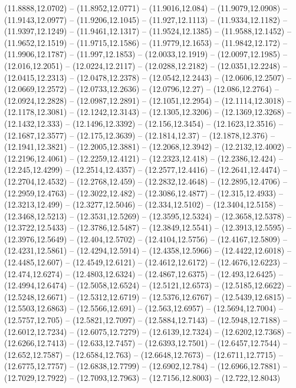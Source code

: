 {(11.8888,12.0702) -- (11.8952,12.0771) -- (11.9016,12.084) -- (11.9079,12.0908) -- (11.9143,12.0977) -- (11.9206,12.1045) -- (11.927,12.1113) -- (11.9334,12.1182) -- (11.9397,12.1249) -- (11.9461,12.1317) -- (11.9524,12.1385) -- (11.9588,12.1452) --
(11.9652,12.1519) -- (11.9715,12.1586) -- (11.9779,12.1653) -- (11.9842,12.172) -- (11.9906,12.1787) -- (11.997,12.1853) -- (12.0033,12.1919) -- (12.0097,12.1985) -- (12.016,12.2051) -- (12.0224,12.2117) -- (12.0288,12.2182) -- (12.0351,12.2248) --
(12.0415,12.2313) -- (12.0478,12.2378) -- (12.0542,12.2443) -- (12.0606,12.2507) -- (12.0669,12.2572) -- (12.0733,12.2636) -- (12.0796,12.27) -- (12.086,12.2764) -- (12.0924,12.2828) -- (12.0987,12.2891) -- (12.1051,12.2954) -- (12.1114,12.3018) --
(12.1178,12.3081) -- (12.1242,12.3143) -- (12.1305,12.3206) -- (12.1369,12.3268) -- (12.1432,12.333) -- (12.1496,12.3392) -- (12.156,12.3454) -- (12.1623,12.3516) -- (12.1687,12.3577) -- (12.175,12.3639) -- (12.1814,12.37) -- (12.1878,12.376) --
(12.1941,12.3821) -- (12.2005,12.3881) -- (12.2068,12.3942) -- (12.2132,12.4002) -- (12.2196,12.4061) -- (12.2259,12.4121) -- (12.2323,12.418) -- (12.2386,12.424) -- (12.245,12.4299) -- (12.2514,12.4357) -- (12.2577,12.4416) -- (12.2641,12.4474) --
(12.2704,12.4532) -- (12.2768,12.459) -- (12.2832,12.4648) -- (12.2895,12.4706) -- (12.2959,12.4763) -- (12.3022,12.482) -- (12.3086,12.4877) -- (12.315,12.4933) -- (12.3213,12.499) -- (12.3277,12.5046) -- (12.334,12.5102) -- (12.3404,12.5158) --
(12.3468,12.5213) -- (12.3531,12.5269) -- (12.3595,12.5324) -- (12.3658,12.5378) -- (12.3722,12.5433) -- (12.3786,12.5487) -- (12.3849,12.5541) -- (12.3913,12.5595) -- (12.3976,12.5649) -- (12.404,12.5702) -- (12.4104,12.5756) -- (12.4167,12.5809)
-- (12.4231,12.5861) -- (12.4294,12.5914) -- (12.4358,12.5966) -- (12.4422,12.6018) -- (12.4485,12.607) -- (12.4549,12.6121) -- (12.4612,12.6172) -- (12.4676,12.6223) -- (12.474,12.6274) -- (12.4803,12.6324) -- (12.4867,12.6375) -- (12.493,12.6425)
-- (12.4994,12.6474) -- (12.5058,12.6524) -- (12.5121,12.6573) -- (12.5185,12.6622) -- (12.5248,12.6671) -- (12.5312,12.6719) -- (12.5376,12.6767) -- (12.5439,12.6815) -- (12.5503,12.6863) -- (12.5566,12.691) -- (12.563,12.6957) -- (12.5694,12.7004)
-- (12.5757,12.705) -- (12.5821,12.7097) -- (12.5884,12.7143) -- (12.5948,12.7188) -- (12.6012,12.7234) -- (12.6075,12.7279) -- (12.6139,12.7324) -- (12.6202,12.7368) -- (12.6266,12.7413) -- (12.633,12.7457) -- (12.6393,12.7501) -- (12.6457,12.7544)
-- (12.652,12.7587) -- (12.6584,12.763) -- (12.6648,12.7673) -- (12.6711,12.7715) -- (12.6775,12.7757) -- (12.6838,12.7799) -- (12.6902,12.784) -- (12.6966,12.7881) -- (12.7029,12.7922) -- (12.7093,12.7963) -- (12.7156,12.8003) -- (12.722,12.8043)
}
